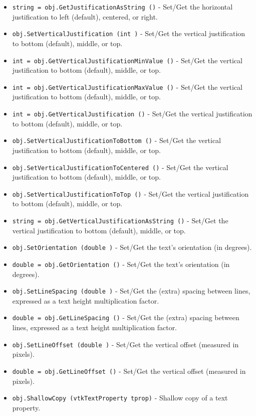 \begin{itemize}
\item  \verb|string = obj.GetJustificationAsString ()| -  Set/Get the horizontal justification to left (default), centered,
 or right.

\item  \verb|obj.SetVerticalJustification (int )| -  Set/Get the vertical justification to bottom (default), middle,
 or top.

\item  \verb|int = obj.GetVerticalJustificationMinValue ()| -  Set/Get the vertical justification to bottom (default), middle,
 or top.

\item  \verb|int = obj.GetVerticalJustificationMaxValue ()| -  Set/Get the vertical justification to bottom (default), middle,
 or top.

\item  \verb|int = obj.GetVerticalJustification ()| -  Set/Get the vertical justification to bottom (default), middle,
 or top.

\item  \verb|obj.SetVerticalJustificationToBottom ()| -  Set/Get the vertical justification to bottom (default), middle,
 or top.

\item  \verb|obj.SetVerticalJustificationToCentered ()| -  Set/Get the vertical justification to bottom (default), middle,
 or top.

\item  \verb|obj.SetVerticalJustificationToTop ()| -  Set/Get the vertical justification to bottom (default), middle,
 or top.

\item  \verb|string = obj.GetVerticalJustificationAsString ()| -  Set/Get the vertical justification to bottom (default), middle,
 or top.

\item  \verb|obj.SetOrientation (double )| -  Set/Get the text's orientation (in degrees).

\item  \verb|double = obj.GetOrientation ()| -  Set/Get the text's orientation (in degrees).

\item  \verb|obj.SetLineSpacing (double )| -  Set/Get the (extra) spacing between lines,
 expressed as a text height multiplication factor.

\item  \verb|double = obj.GetLineSpacing ()| -  Set/Get the (extra) spacing between lines,
 expressed as a text height multiplication factor.

\item  \verb|obj.SetLineOffset (double )| -  Set/Get the vertical offset (measured in pixels).

\item  \verb|double = obj.GetLineOffset ()| -  Set/Get the vertical offset (measured in pixels).

\item  \verb|obj.ShallowCopy (vtkTextProperty tprop)| -  Shallow copy of a text property.

\end{itemize}
